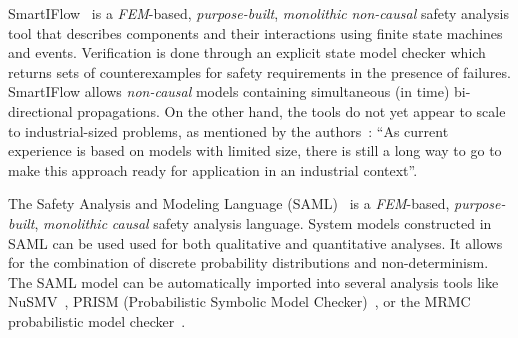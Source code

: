 
SmartIFlow~\cite{info8010007} is a {\em FEM}-based, {\em purpose-built}, {\em monolithic} {\em non-causal} safety analysis tool that describes components and their interactions using finite state machines and events. Verification is done through an explicit state model checker which returns sets of counterexamples for safety requirements in the presence of failures.  SmartIFlow allows {\em non-causal} models containing simultaneous (in time) bi-directional %
 propagations.  On the other hand, the tools do not yet appear to scale to industrial-sized problems, as mentioned by the authors~\cite{info8010007}: ``As current experience is based on models with limited size, there is still a long way to go to make this approach ready for application in an industrial context''.


The Safety Analysis and Modeling Language (SAML)~\cite{Gudemann:2010:FQQ:1909626.1909813} is a {\em FEM}-based, {\em purpose-built}, {\em monolithic} {\em causal} safety analysis language.  System models constructed in SAML can be used used for both qualitative and quantitative analyses. It allows for the combination of discrete probability distributions and non-determinism. The SAML model can be automatically imported into several analysis tools like NuSMV~\cite{Cimatti2000}, PRISM (Probabilistic Symbolic Model Checker)~\cite{CAV2011:KwNoPa}, or the MRMC probabilistic model checker~\cite{Katoen:2005:MRM:1114692.1115230}. 



